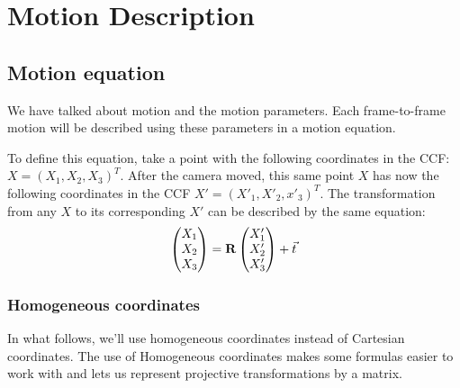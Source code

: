 \section{Motion Description}
\subsection{Motion equation}
We have talked about motion and the motion parameters. Each frame-to-frame motion will be described using these parameters in a motion equation.\bigskip

To define this equation, take a point with the following coordinates in the CCF: $X = (X_1, X_2, X_3)^T$. After the camera moved, this same point $X$ has now the following coordinates in the CCF $X' = (X'_1, X'_2, x'_3)^T$. The transformation from any $X$ to its corresponding $X'$ can be described by the same equation:
\begin{equation}\label{eq:motion}
    \begin{pmatrix}
        X_1\\ X_2\\ X_3
    \end{pmatrix} =  \mathbf{R} \begin{pmatrix}
        X'_1\\ X'_2\\ X'_3
    \end{pmatrix}+ \vec t
\end{equation}

\subsubsection{Homogeneous coordinates}
In what follows, we'll use homogeneous coordinates instead of Cartesian coordinates. The use of Homogeneous coordinates makes some formulas easier to work with and lets us represent projective transformations by a matrix. \bigskip

